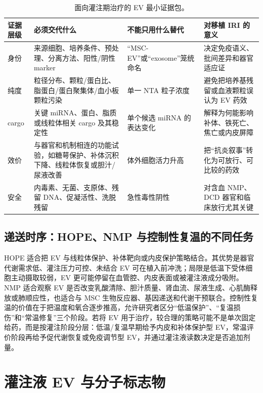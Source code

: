 \documentclass[11pt,a4paper]{article}
\begin{document}
\begin{table}[htbp]
\centering
\small
\caption{面向灌注期治疗的 EV 最小证据包。}
\begin{tabularx}{\textwidth}{p{}YYY}
\toprule
证据层级 & 必须交代什么 & 不能只用什么替代 & 对移植 IRI 的意义 \\
\midrule
身份 & 来源细胞、培养条件、预处理、分离方法、阳性/阴性 marker & ``MSC-EV''或``exosome''笼统命名 & 决定免疫语义、批间差异和器官适应证 \\
纯度 & 粒径分布、颗粒/蛋白比、脂蛋白/蛋白聚集体/血小板颗粒污染 & 单一 NTA 粒子浓度 & 避免把培养基残留或血液颗粒误认为 EV 药效 \\
cargo & 关键 miRNA、蛋白、脂质或线粒体相关 cargo 及其稳定性 & 单个候选 miRNA 的表达变化 & 解释为何能影响补体、铁死亡、焦亡或内皮屏障 \\
效价 & 与器官和机制相连的功能试验，如糖萼保护、补体沉积下降、线粒体恢复或胆汁/尿液改善 & 体外细胞活力升高 & 把``抗炎叙事''转化为可放行、可比较的药效 \\
安全 & 内毒素、无菌、支原体、残留 DNA、促凝活性、洗脱残留 & 急性毒性阴性 & 对含血 NMP、DCD 器官和临床放行尤其关键 \\
\bottomrule
\end{tabularx}
\end{table}

\subsection{递送时序：HOPE、NMP 与控制性复温的不同任务}

HOPE 适合把 EV 与线粒体保护、补体靶向或内皮保护策略结合。其优势是器官代谢需求低、灌注压力可控、未结合 EV
可在植入前冲洗；局限是低温下受体细胞主动摄取较弱，EV 更可能停留在血管腔、内皮表面或被灌注液成分吸附。NMP
适合观察 EV 是否改变乳酸清除、胆汁质量、肾血流、尿液生成、心肌酶释放或肺顺应性，也适合与 MSC
生物反应器、基因递送和代谢干预联合\cite{mesenchymalstemcell2023, aproofof2025, exvivomesenchymal2021}。控制性复温的价值在于把温度和氧合逐步推高，允许研究者区分``低温保护''、``复温损伤''和``常温修复''三个阶段。若将 EV
用于治疗，较合理的策略可能不是单次固定给药，而是按灌注阶段分层：低温/复温早期给予内皮和补体保护型 EV，常温评价阶段再给予促代谢恢复或免疫调节型
EV，并通过灌注液读数决定是否追加剂量。

\section{灌注液 EV
与分子标志物}\label{ux704cux6ce8ux6db2-ev-ux4e0eux5206ux5b50ux6807ux5fd7ux7269}
\end{document}
